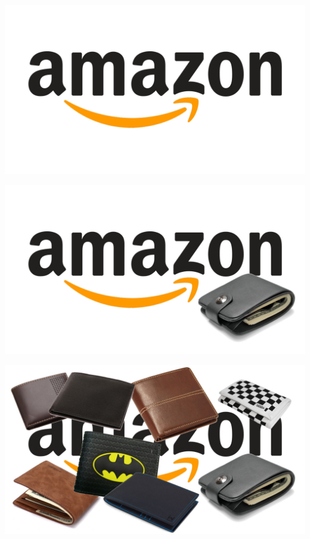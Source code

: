 \documentclass[aspectratio=169,x11names]{beamer}
\begin{document}
\begin{frame}
\begin{center}
\includegraphics[width=\textwidth]{images/amazon-logo.jpg} 
\end{center}
\end{frame}

\begin{frame}
\begin{center}
\includegraphics[width=\textwidth]{images/amazon-one-wallet.jpg} 
\end{center}
\end{frame}

\begin{frame}
\begin{center}
\includegraphics[width=\textwidth]{images/amazon-buncha-wallets.jpg} 
\end{center}
\end{frame}
\end{document}
